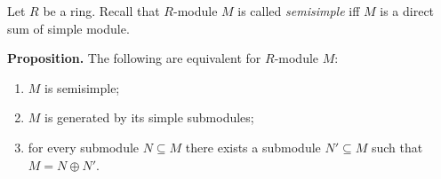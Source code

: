 \documentclass[12pt]{article}
\begin{document}
Let $R$ be a ring. Recall that $R$-module $M$ is called \textit{semisimple} iff $M$ is a direct sum of simple module.

\textbf{Proposition.} The following are equivalent for $R$-module $M$:\begin{enumerate}\item $M$ is semisimple;
\item $M$ is generated by its simple submodules;
\item for every submodule $N\subseteq M$ there exists a submodule $N'\subseteq M$ such that $M=N\oplus N'$.
\end{enumerate}
\end{document}
